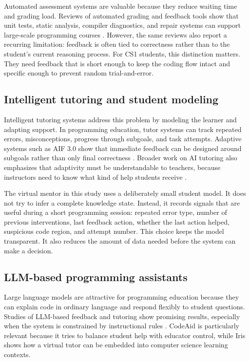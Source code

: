 \documentclass[11pt]{article}
\begin{document}
Automated assessment systems are valuable because they reduce waiting time and grading load. Reviews of automated grading and feedback tools show that unit tests, static analysis, compiler diagnostics, and repair systems can support large-scale programming courses \cite{AutomatedGradingandFeedbackToolsforProgrammingEducationSystematicReview,NavigatingAutomatedFeedback}. However, the same reviews also report a recurring limitation: feedback is often tied to correctness rather than to the student's current reasoning process. For CS1 students, this distinction matters. They need feedback that is short enough to keep the coding flow intact and specific enough to prevent random trial-and-error.

\subsection{Intelligent tutoring and student modeling}

Intelligent tutoring systems address this problem by modeling the learner and adapting support. In programming education, tutor systems can track repeated errors, misconceptions, progress through subgoals, and task attempts. Adaptive systems such as AIF 3.0 show that immediate feedback can be designed around subgoals rather than only final correctness \cite{AdaptiveImmediateFeedbackforBlockBasedProgramming}. Broader work on AI tutoring also emphasizes that adaptivity must be understandable to teachers, because instructors need to know what kind of help students receive \cite{AITutoringinSDEducation,AIEnabledIntelligentAssistant}.

The virtual mentor in this study uses a deliberately small student model. It does not try to infer a complete knowledge state. Instead, it records signals that are useful during a short programming session: repeated error type, number of previous interventions, last feedback action, whether the last action helped, suspicious code region, and attempt number. This choice keeps the model transparent. It also reduces the amount of data needed before the system can make a decision.

\subsection{LLM-based programming assistants}

Large language models are attractive for programming education because they can explain code in ordinary language and respond flexibly to student questions. Studies of LLM-based feedback and tutoring show promising results, especially when the system is constrained by instructional rules \cite{CodeAid,IRIS,AutomatingHumanTutorStyleProgrammingFeedback,EvaluationofLLMtoolsforfeedbackgeneration}. CodeAid is particularly relevant because it tries to balance student help with educator control, while Iris shows how a virtual tutor can be embedded into computer science learning contexts.
\end{document}
